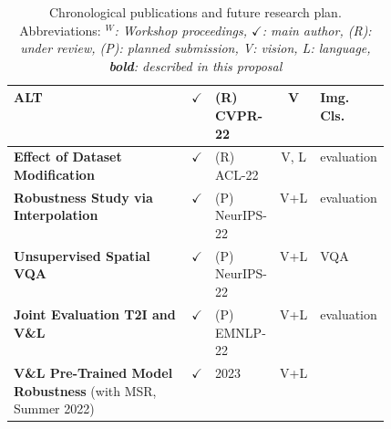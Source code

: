 \begin{table}
{\begin{tabular}{@{}p{0.48\linewidth}clcl@{}}
        \textbf{ALT}                                        & $\checkmark$  & (R) CVPR-22   & V     & Img. Cls. \\
        \midrule 
        \textbf{Effect of Dataset Modification}~\citep{}    & $\checkmark$  & (R) ACL-22    & V, L  & evaluation \\
        \textbf{Robustness Study via Interpolation}         & $\checkmark$  & (P) NeurIPS-22 & V{+}L & evaluation \\
        \textbf{Unsupervised Spatial VQA}                   & $\checkmark$  & (P) NeurIPS-22 & V{+}L & VQA \\      
        \textbf{Joint Evaluation T2I and V\&L}              & $\checkmark$  & (P) EMNLP-22  & V{+}L & evaluation \\
        \textbf{V\&L Pre-Trained Model Robustness} (with MSR, Summer 2022) & $\checkmark$ & 2023 & V{+}L \\
        \bottomrule
    \end{tabular}
    }
    \caption{
    Chronological publications and future research plan.
    Abbreviations: \textit{$^W$: Workshop proceedings, $\checkmark$: main author, (R): under review, (P): planned submission, V: vision, L: language, \textbf{bold}: described in this proposal
    }
    }
    \label{tab:research_plan}
\end{table}
